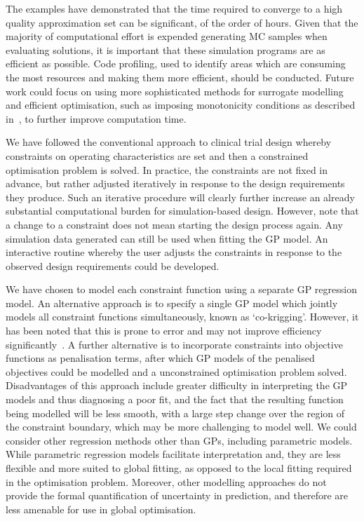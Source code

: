 \documentclass{article} %
\begin{document}
The examples have demonstrated that the time required to converge to a high quality approximation set can be significant, of the order of hours. Given that the majority of computational effort is expended generating MC samples when evaluating solutions, it is important that these simulation programs are as efficient as possible. Code profiling, used to identify areas which are consuming the most resources and making them more efficient, should be conducted. Future work could focus on using more sophisticated methods for surrogate modelling and efficient optimisation, such as imposing monotonicity conditions as described in~\cite{Emmerich2011}, to further improve computation time.

We have followed the conventional approach to clinical trial design whereby constraints on operating characteristics are set and then a constrained optimisation problem is solved. In practice, the constraints are not fixed in advance, but rather adjusted iteratively in response to the design requirements they produce. Such an iterative procedure will clearly further increase an already substantial computational burden for simulation-based design. However, note that a change to a constraint does not mean starting the design process again. Any simulation data generated can still be used when fitting the GP model. An interactive routine whereby the user adjusts the constraints in response to the observed design requirements could be developed.

We have chosen to model each constraint function using a separate GP regression model. An alternative approach is to specify a single GP model which jointly models all constraint functions simultaneously, known as `co-krigging'. However, it has been noted that this is prone to error and may not improve efficiency significantly~\cite{}. A further alternative is to incorporate constraints into objective functions as penalisation terms, after which GP models of the penalised objectives could be modelled and a unconstrained optimisation problem solved. Disadvantages of this approach include greater difficulty in interpreting the GP models and thus diagnosing a poor fit, and the fact that the resulting function being modelled will be less smooth, with a large step change over the region of the constraint boundary, which may be more challenging to model well. We could consider other regression methods other than GPs, including parametric models. While parametric regression models facilitate interpretation and, they are less flexible and more suited to global fitting, as opposed to the local fitting required in the optimisation problem. Moreover, other modelling approaches do not provide the formal quantification of uncertainty in prediction, and therefore are less amenable for use in global optimisation. 
\end{document}
